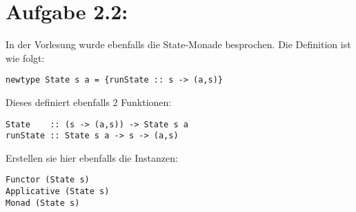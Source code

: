 \documentclass[a4paper,10pt]{scrartcl}
\newcommand{\theuebungszettel}{2}
\begin{document}
\section*{Aufgabe \theuebungszettel.2:}
In der Vorlesung wurde ebenfalls die State-Monade besprochen. Die Definition ist wie folgt:
\begin{verbatim}
newtype State s a = {runState :: s -> (a,s)}
\end{verbatim}
Dieses definiert ebenfalls 2 Funktionen:
\begin{verbatim}
State    :: (s -> (a,s)) -> State s a
runState :: State s a -> s -> (a,s)
\end{verbatim}
Erstellen sie hier ebenfalls die Instanzen:
\begin{verbatim}
Functor (State s)
Applicative (State s)
Monad (State s)
\end{verbatim}
\end{document}

